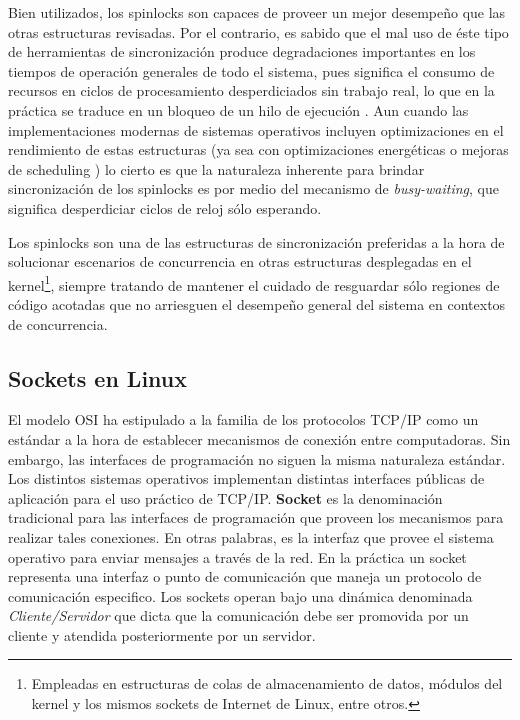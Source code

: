 Bien utilizados, los spinlocks son capaces de proveer un mejor desempeño que las otras estructuras revisadas. Por el contrario, es sabido que el mal uso de éste tipo de herramientas de sincronización produce degradaciones importantes en los tiempos de operación generales de todo el sistema, pues significa el consumo de recursos en ciclos de procesamiento desperdiciados sin trabajo real, lo que en la práctica se traduce en un bloqueo de un hilo de ejecución \cite{paper:nonscalablelocks, paper:cachebouncing}. Aun cuando las implementaciones modernas de sistemas operativos incluyen optimizaciones en el rendimiento de estas estructuras (ya sea con optimizaciones energéticas o mejoras de scheduling \cite{paper:cacheaffinity}) lo cierto es que la naturaleza inherente para brindar sincronización de los spinlocks es por medio del mecanismo de \emph{busy-waiting}, que significa desperdiciar ciclos de reloj sólo esperando.

Los spinlocks son una de las estructuras de sincronización preferidas a la hora de solucionar escenarios de concurrencia en otras estructuras desplegadas en el kernel\footnote{Empleadas en estructuras de colas de almacenamiento de datos, módulos del kernel y los mismos sockets de Internet de Linux, entre otros.}, siempre tratando de mantener el cuidado de resguardar sólo regiones de código acotadas que no arriesguen el desempeño general del sistema en contextos de concurrencia.


\subsection{Sockets en Linux}
El modelo OSI ha estipulado a la familia de los protocolos TCP/IP como un estándar a la hora de establecer mecanismos de conexión entre computadoras. Sin embargo, las interfaces de programación no siguen la misma naturaleza estándar. Los distintos sistemas operativos implementan distintas interfaces públicas de aplicación para el uso práctico de TCP/IP. \textbf{Socket} es la denominación tradicional para las interfaces de programación que proveen los mecanismos para realizar tales conexiones. En otras palabras, es la interfaz que provee el sistema operativo para enviar mensajes a través de la red. En la práctica un socket representa una interfaz o punto de comunicación que maneja un protocolo de comunicación especifico. Los sockets operan bajo una dinámica denominada \emph{Cliente/Servidor} que dicta que la comunicación debe ser promovida por un cliente y atendida posteriormente por un servidor.

